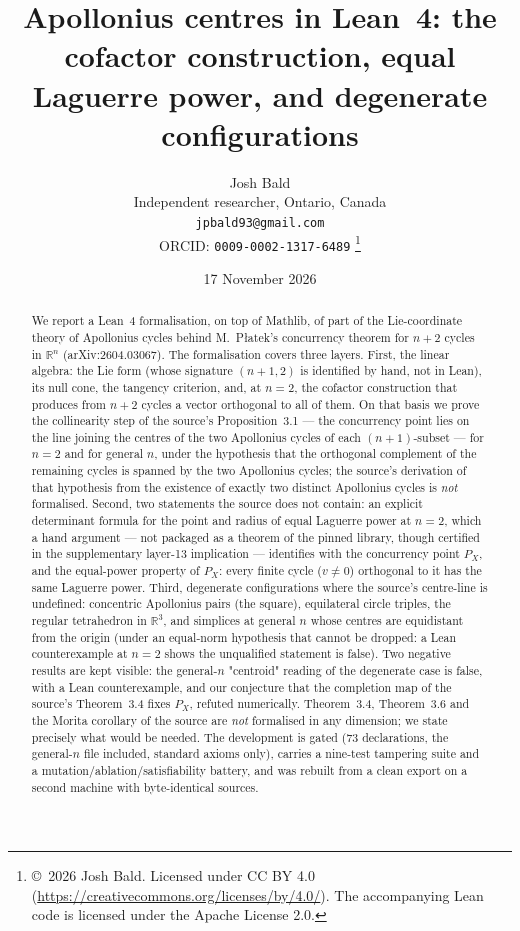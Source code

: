 \documentclass[11pt]{article}
\title{Apollonius centres in Lean~4: the cofactor construction, equal Laguerre power, and degenerate configurations}
\author{Josh Bald\\ \small Independent researcher, Ontario, Canada\\ \small\texttt{jpbald93@gmail.com}\\
\small ORCID: \texttt{0009-0002-1317-6489}
\thanks{\copyright~2026 Josh Bald. Licensed under CC BY 4.0
(\url{https://creativecommons.org/licenses/by/4.0/}). The accompanying Lean code is licensed under
the Apache License 2.0.}}
\date{17 November 2026}
\theoremstyle{definition}
\theoremstyle{remark}
\newcommand{\RR}{\mathbb{R}}
\begin{document}
\sloppy
\maketitle

\begin{abstract}
We report a Lean~4 formalisation, on top of Mathlib, of part of the Lie-coordinate theory of
Apollonius cycles behind M.~Płatek's concurrency theorem for $n+2$ cycles in $\RR^n$
(arXiv:2604.03067). The formalisation covers three layers. First, the linear algebra: the
Lie form (whose signature $(n+1,2)$ is identified by hand, not in Lean), its null cone, the tangency
criterion, and, at $n=2$, the cofactor
construction that produces from $n+2$ cycles a vector orthogonal to all of them. On that basis we prove the
collinearity step of the source's Proposition~3.1 --- the concurrency point lies on the line joining
the centres of the two Apollonius cycles of each $(n+1)$-subset --- for $n=2$ and for general $n$,
under the hypothesis that the orthogonal complement of the remaining cycles is spanned by the two
Apollonius cycles; the source's derivation of that hypothesis from the existence of exactly two
distinct Apollonius cycles is \emph{not} formalised. Second, two statements the source does not
contain: an explicit determinant formula for the point and radius of equal Laguerre power at $n=2$,
which a hand argument --- not packaged as a theorem of the pinned library, though certified in the supplementary layer-13 implication --- identifies with the concurrency point $P_X$, and the
equal-power property of $P_X$: every finite cycle ($v\neq0$) orthogonal to it has the same Laguerre
power. Third, degenerate configurations where the source's centre-line is
undefined: concentric Apollonius pairs (the square), equilateral circle triples, the regular
tetrahedron in $\RR^3$, and simplices at general $n$ whose centres are equidistant from the origin
(under an equal-norm hypothesis that cannot be dropped: a Lean
counterexample at $n=2$ shows the unqualified statement is false). Two negative results are kept visible: the general-$n$ "centroid" reading of the
degenerate case is false, with a Lean counterexample, and our conjecture that the completion map of the
source's Theorem~3.4 fixes $P_X$, refuted numerically. Theorem~3.4, Theorem~3.6 and the Morita corollary
of the source are \emph{not} formalised in any dimension; we state precisely what would be needed.
The development is gated (73 declarations, the general-$n$ file included, standard axioms only), carries a nine-test tampering
suite and a mutation/ablation/satisfiability battery, and was rebuilt from a clean export on a second
machine with byte-identical sources.
\end{abstract}
\end{document}
